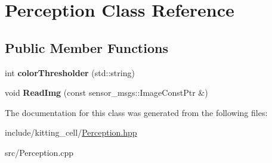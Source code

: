\hypertarget{classPerception}{}\section{Perception Class Reference}
\label{classPerception}
\subsection*{Public Member Functions}
\begin{DoxyCompactItemize}
\item 
int {\bfseries color\+Thresholder} (std\+::string)\hypertarget{classPerception_a95ba572f959879c929aefee10be2da6d}{}\label{classPerception_a95ba572f959879c929aefee10be2da6d}

\item 
void {\bfseries Read\+Img} (const sensor\+\_\+msgs\+::\+Image\+Const\+Ptr \&)\hypertarget{classPerception_ad9b0db26efb0a6a8ea1d5af46c12848e}{}\label{classPerception_ad9b0db26efb0a6a8ea1d5af46c12848e}

\end{DoxyCompactItemize}


The documentation for this class was generated from the following files\+:\begin{DoxyCompactItemize}
\item 
include/kitting\+\_\+cell/\hyperlink{Perception_8hpp}{Perception.\+hpp}\item 
src/Perception.\+cpp\end{DoxyCompactItemize}
